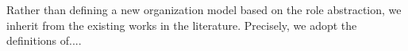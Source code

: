 Rather than defining a new organization model based on the role abstraction, we inherit from the existing works in the literature. Precisely, we adopt the definitions of.... %


%
%
%	
%	
%	
%	
%	
%	
%		
%	
%	
%		
%	

